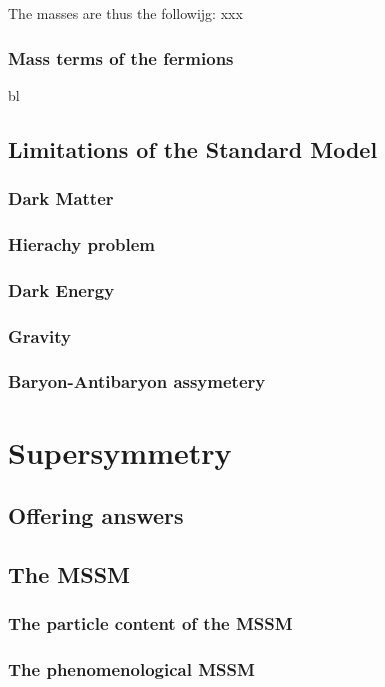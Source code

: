 The masses are thus the followijg:
xxx


\subsection*{Mass terms of the fermions}

bl

\section{Limitations of the Standard Model}

\subsection*{Dark Matter}
\subsection*{Hierachy problem}
\subsection*{Dark Energy}
\subsection*{Gravity}
\subsection*{Baryon-Antibaryon assymetery}

\chapter{Supersymmetry}
\section{Offering answers}

\section{The MSSM}
\subsection{The particle content of the MSSM}
\subsection{The phenomenological MSSM}

